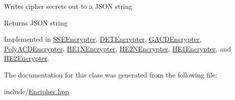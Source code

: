 Writes cipher secrets out to a J\+S\+ON string \begin{DoxyReturn}{Returns}
J\+S\+ON string 
\end{DoxyReturn}


Implemented in \hyperlink{classSSEEncrypter_a70e01b58fe0de0931cdb00ee97ee4af9}{S\+S\+E\+Encrypter}, \hyperlink{classDETEncrypter_a30ffe8f94a95f723e62d0b1a1ed8dc56}{D\+E\+T\+Encrypter}, \hyperlink{classGACDEncrypter_a01cd18ae81d0d28076c4ceb690a8b418}{G\+A\+C\+D\+Encrypter}, \hyperlink{classPolyACDEncrypter_af478f2fe3f886d23749955eaa72e413b}{Poly\+A\+C\+D\+Encrypter}, \hyperlink{classHE1NEncrypter_ad1bca3e0933b8e15b91d208e421f83b2}{H\+E1\+N\+Encrypter}, \hyperlink{classHE2NEncrypter_a720d4ee52dadd55f61631554d2942a6b}{H\+E2\+N\+Encrypter}, \hyperlink{classHE1Encrypter_a05627c66faf89c133a24fa7bb4553ef2}{H\+E1\+Encrypter}, and \hyperlink{classHE2Encrypter_a8cdf863bfbe046b4e57322adf5addddb}{H\+E2\+Encrypter}.



The documentation for this class was generated from the following file\+:\begin{DoxyCompactItemize}
\item 
include/\hyperlink{Encipher_8hpp}{Encipher.\+hpp}\end{DoxyCompactItemize}
